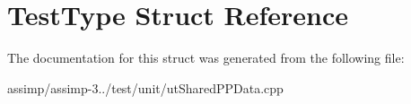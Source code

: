 \hypertarget{struct_test_type}{\section{Test\+Type Struct Reference}
\label{struct_test_type}
}


The documentation for this struct was generated from the following file\+:\begin{DoxyCompactItemize}
\item 
assimp/assimp-\/3../test/unit/ut\+Shared\+P\+P\+Data.\+cpp\end{DoxyCompactItemize}
